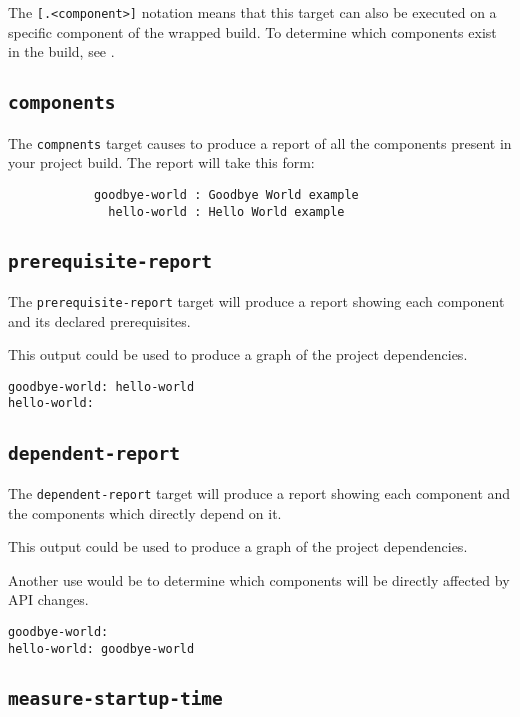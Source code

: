The \texttt{[.<component>]} notation means that this target can also
be executed on a specific component of the wrapped build.  To
determine which components exist in the build, see
.

\subsection{\texttt{components}}\label{lmsbw:target:components}

The \texttt{compnents} target causes \lmsbw to produce a report of all
the components present in your project build.  The report will take
this form:

\begin{verbatim}
            goodbye-world : Goodbye World example
              hello-world : Hello World example
\end{verbatim}

\subsection{\texttt{prerequisite-report}}

The \texttt{prerequisite-report} target will produce a report showing
each component and its declared prerequisites.

This output could be used to produce a graph of the project dependencies.

\begin{verbatim}
goodbye-world: hello-world
hello-world:
\end{verbatim}

\subsection{\texttt{dependent-report}}

The \texttt{dependent-report} target will produce a report showing
each component and the components which directly depend on it.

This output could be used to produce a graph of the project
dependencies.

Another use would be to determine which components will be directly
affected by API changes.

\begin{verbatim}
goodbye-world:
hello-world: goodbye-world
\end{verbatim}

\subsection{\texttt{measure-startup-time}}\label{usinglmsbw:measure-startup-time}

